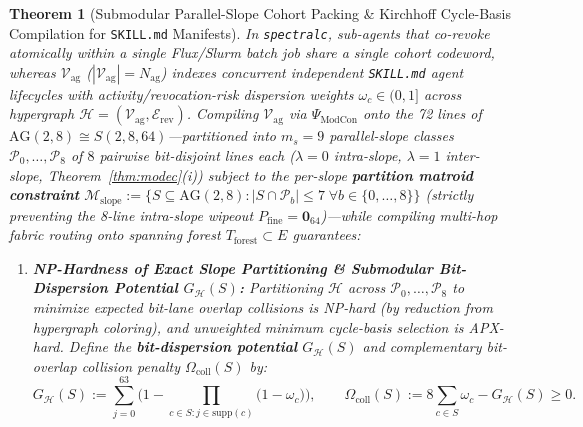 \documentclass[10pt,twocolumn]{article}
\theoremstyle{spectralthm}
\newtheorem{theorem}{Theorem}[section]
\begin{document}
\begin{theorem}[Submodular Parallel-Slope Cohort Packing \& Kirchhoff Cycle-Basis Compilation for \texttt{SKILL.md} Manifests]
\label{thm:submodular_modcon}
In \texttt{spectralc}, sub-agents that co-revoke atomically within a single Flux/Slurm batch job share a single cohort codeword, whereas $\mathcal{V}_{\mathrm{ag}}$ ($|\mathcal{V}_{\mathrm{ag}}| = N_{\mathrm{ag}}$) indexes concurrent \emph{independent} \texttt{SKILL.md} agent lifecycles with activity/revocation-risk dispersion weights $\omega_c \in (0,1]$ across hypergraph $\mathcal{H} = (\mathcal{V}_{\mathrm{ag}}, \mathcal{E}_{\mathrm{rev}})$. Compiling $\mathcal{V}_{\mathrm{ag}}$ via $\Psi_{\mathrm{ModCon}}$ onto the 72 lines of $\mathrm{AG}(2,8) \cong S(2,8,64)$---partitioned into $m_s = 9$ parallel-slope classes $\mathcal{P}_0, \ldots, \mathcal{P}_8$ of $8$ pairwise bit-disjoint lines each ($\lambda = 0$ intra-slope, $\lambda = 1$ inter-slope, Theorem~\ref{thm:modec}(i)) subject to the per-slope \textbf{partition matroid constraint} $\mathcal{M}_{\mathrm{slope}} := \{S \subseteq \mathrm{AG}(2,8) : |S \cap \mathcal{P}_b| \le 7\;\forall b \in \{0,\ldots,8\}\}$ (strictly preventing the 8-line intra-slope wipeout $P_{\mathrm{fine}} = \mathbf{0}_{64}$)---while compiling multi-hop fabric routing onto spanning forest $T_{\mathrm{forest}} \subset E$ guarantees:
\begin{enumerate}
  \item[(i)] \textbf{NP-Hardness of Exact Slope Partitioning \& Submodular Bit-Dispersion Potential $G_{\mathcal{H}}(S)$:} Partitioning $\mathcal{H}$ across $\mathcal{P}_0,\ldots,\mathcal{P}_8$ to minimize expected bit-lane overlap collisions is NP-hard (by reduction from hypergraph coloring), and unweighted minimum cycle-basis selection is APX-hard. Define the \textbf{bit-dispersion potential} $G_{\mathcal{H}}(S)$ and complementary bit-overlap collision penalty $\Omega_{\mathrm{coll}}(S)$ by:
  \begin{equation}
  \label{eq:submodular_dispersion}
  G_{\mathcal{H}}(S) := \sum_{j=0}^{63} \Biggl(1 - \prod_{c \in S : j \in \mathrm{supp}(c)} \bigl(1 - \omega_c\bigr)\Biggr),\qquad
  \Omega_{\mathrm{coll}}(S) := 8 \sum_{c \in S} \omega_c - G_{\mathcal{H}}(S) \ge 0.
  \end{equation}

\end{enumerate}
\end{theorem}
\end{document}
